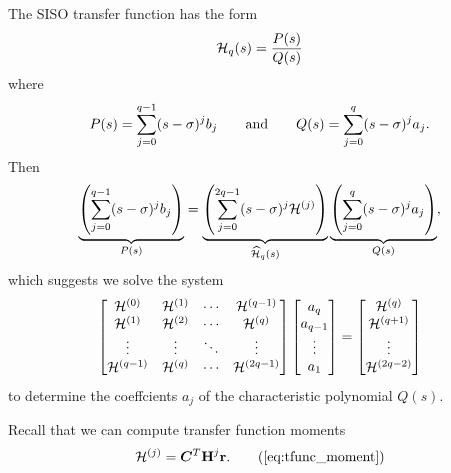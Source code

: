 The SISO transfer function has the \pade{} form 
\begin{equation}
\mathcal{H}_{q}(s) = \frac{P(s)}{Q(s)}
\label{eq:tfunc_pade}
\end{equation}
where
\[
P(s) = \sum_{j=0}^{q-1} (s-\sigma)^j b_j \qquad \text{and}\qquad
Q(s) =\sum_{j=0}^{q} (s-\sigma)^j a_j.
\]
Then 
\[
\underbrace{\left( \sum_{j=0}^{q-1} (s-\sigma)^j b_j  \right)}_{P(s)}
=
\underbrace{\left( \sum_{j=0}^{2q-1} (s-\sigma)^j \mathcal{H}^{(j)} \right)}_{\widehat{\mathcal{H}}_q(s)}
\underbrace{\left( \sum_{j=0}^{q} (s-\sigma)^j a_j \right)}_{Q(s)},
\] 
which suggests we solve the  system 
\begin{equation}
\begin{bmatrix} \mathcal{H}^{(0)} & \mathcal{H}^{(1)} & \cdots & \mathcal{H}^{(q-1)}  \\
       \mathcal{H}^{(1)} & \mathcal{H}^{(2)} & \cdots & \mathcal{H}^{(q)}  \\ 
\vdots & \vdots & \ddots & \vdots \\
\mathcal{H}^{(q-1)} & \mathcal{H}^{(q)} & \cdots & \mathcal{H}^{(2q-1)} 
\end{bmatrix}
\begin{bmatrix} a_q \\ a_{q-1} \\ \vdots \\ a_1\end{bmatrix} =
\begin{bmatrix} \mathcal{H}^{(q)} \\ \mathcal{H}^{(q+1)}\\ \vdots \\ \mathcal{H}^{(2q-2)}\end{bmatrix}
\label{eq:AWE_system}
\end{equation}
to determine the coeffcients  $a_j$ of the characteristic polynomial $Q(s)$.
 
 Recall that we can compute transfer function moments 
\begin{equation}
\mo{j} = \CC^T \H^j \Rr.
\tag{\ref{eq:tfunc_moment}}
\end{equation}

